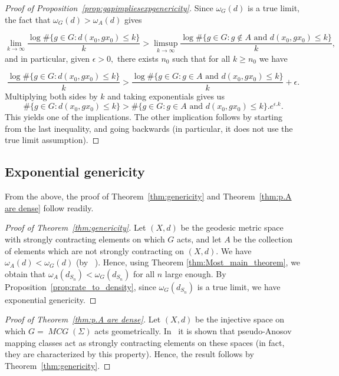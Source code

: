 \documentclass{amsart}
\numberwithin{thm}{section}
\numberwithin{figure}{section}
\theoremstyle{definition}
\theoremstyle{definition}
\theoremstyle{remark}
\numberwithin{equation}{section}
\DeclareMathOperator{\MCG}{\mathit{MCG}}
\theoremstyle{plain}
\begin{document}
\begin{proof}[Proof of Proposition~\ref{prop:gapimpliesexpgenericity}] Since $\omega_G(d)$ is a true limit, the fact that $\omega_G(d)> \omega_A(d)$ gives 

\[\lim_{k \rightarrow \infty} \frac{\log \#\{g \in G: d(x_0,g x_0) \leq k\}}{k}> \limsup_{k \rightarrow \infty} \frac{\log \#\{g \in G: g \notin A \text{ and }d(x_0,g x_0) \leq k\}}{k},\] and in particular, given $\epsilon>0,$ there exists $n_0$ such that for all $k \geq n_0$ we have 


$$\frac{\log \#\{g \in G: d(x_0,g x_0) \leq k\}}{k}>\frac{\log \#\{g \in G: g \in A \text{ and } d(x_0,g x_0) \leq k\}}{k}+\epsilon.$$ Multiplying both sides by $k$ and taking exponentials gives us $$\#\{g \in G: d(x_0,g x_0) \leq k\} > \#\{g \in G: g \in A \text{ and } d(x_0,g x_0) \leq k\}.e^{\epsilon.k}.$$ This yields one of the implications. The other implication follows by starting from the last inequality, and going backwards (in particular, it does not use the true limit assumption).
\end{proof}

\subsection{Exponential genericity} From the above, the proof of Theorem~\ref{thm:genericity} and Theorem~\ref{thm:p.A are dense} follow readily. 


\begin{proof}[{Proof of Theorem~\ref{thm:genericity}}]
Let $(X,d)$ be the geodesic metric space with strongly contracting elements on which $G$ acts, and let $A$ be the collection of elements which are not strongly contracting on $(X,d)$. We have $\omega_A(d)<\omega_G(d)$ (by ~\cite{Yang2018}). Hence, using Theorem \ref{thm:Most_main_theorem}, we obtain that $\omega_{A}(d_{S_n})<\omega_{G}(d_{S_n})$ for all $n$ large enough. By Proposition~\ref{prop:rate_to_density}, since $\omega_G(d_{S_n})$ is a true limit, we have exponential genericity.
\end{proof}

\begin{proof}[{Proof of Theorem~\ref{thm:p.A are dense}}]
Let $(X,d)$ be the injective space on which $G=\MCG(\Sigma)$ acts geometrically.
In~\cite{SistoZalloum2024} it is shown that pseudo-Anosov mapping classes act as strongly contracting elements on these spaces (in fact, they are characterized by this property).
Hence, the result follows by Theorem~\ref{thm:genericity}.
\end{proof}
\end{document}
